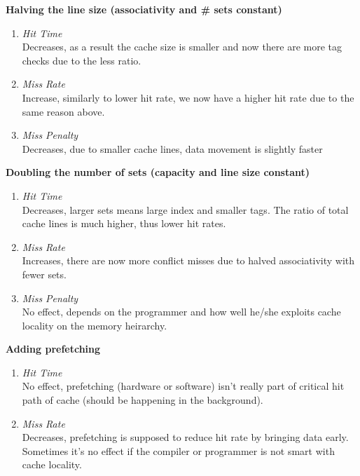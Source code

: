 \documentclass[11pt]{article}
\begin{document}
\begin{Parts}
	\Part \textbf{Halving the line size (associativity and
		\# sets constant)} \\
	\begin{enumerate}[i]
		\item \textit{Hit Time} \\
		      Decreases, as a result the cache size is smaller and now there are more tag checks due to the less ratio.
		\item \textit{Miss Rate} \\
		      Increase, similarly to lower hit rate, we now have a higher hit rate due to the same reason above.
		\item \textit{Miss Penalty} \\
		      Decreases, due to smaller cache lines, data movement is slightly faster
	\end{enumerate}
	\Part \textbf{Doubling the number of sets (capacity and line size constant)} \\
	\begin{enumerate}[i]
		\item \textit{Hit Time} \\
		      Decreases, larger sets means large index and smaller tags. The ratio of total cache lines is much higher, thus lower hit rates.
		\item \textit{Miss Rate} \\
		      Increases, there are now more conflict misses due to halved associativity with fewer sets.
		\item \textit{Miss Penalty} \\
		      No effect, depends on the programmer and how well he/she exploits cache locality on the memory heirarchy.
	\end{enumerate}
	\Part \textbf{Adding prefetching} \\
	\begin{enumerate}[i]
		\item \textit{Hit Time} \\
		      No effect, prefetching (hardware or software) isn't really part of critical hit path of cache (should be happening in the background).
		\item \textit{Miss Rate} \\
		      Decreases, prefetching is supposed to reduce hit rate by bringing data early. Sometimes it's no effect if the compiler or programmer is not smart with cache locality.

\end{enumerate}
\end{Parts}
\end{document}
